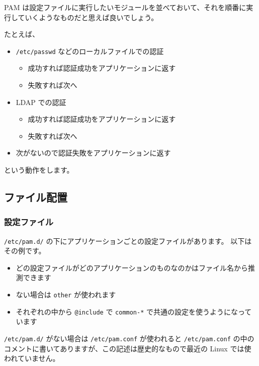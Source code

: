 \documentclass[mingoth,a4paper]{jsarticle}
\begin{document}
PAM は設定ファイルに実行したいモジュールを並べておいて、それを順番に実行していくようなものだと思えば良いでしょう。

たとえば、
\begin{itemize}
\item \verb~/etc/passwd~ などのローカルファイルでの認証
\begin{itemize}
\item 成功すれば認証成功をアプリケーションに返す
\item 失敗すれば次へ
\end{itemize}
\item LDAP での認証
\begin{itemize}
\item 成功すれば認証成功をアプリケーションに返す
\item 失敗すれば次へ
\end{itemize}
\item 次がないので認証失敗をアプリケーションに返す
\end{itemize}
という動作をします。
\subsection{ファイル配置}
\label{sec-1-2}
\subsubsection{設定ファイル}
\label{sec-1-2-1}

\verb~/etc/pam.d/~ の下にアプリケーションごとの設定ファイルがあります。
以下はその例です。



\begin{itemize}
\item どの設定ファイルがどのアプリケーションのものなのかはファイル名から推測できます
\item ない場合は \verb~other~ が使われます
\item それぞれの中から \verb~@include~ で \verb~common-*~ で共通の設定を使うようになっています
\end{itemize}

\verb~/etc/pam.d/~ がない場合は \verb~/etc/pam.conf~ が使われると \verb~/etc/pam.conf~ の中のコメントに書いてありますが、この記述は歴史的なもので最近の Linux では使われていません。
\end{document}

